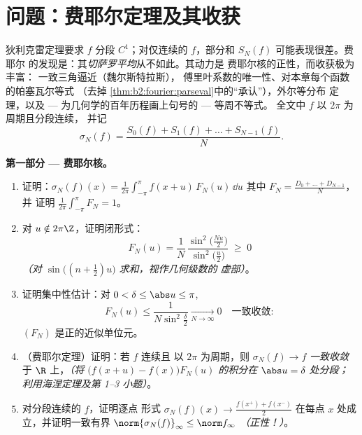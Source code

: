 \section{问题：费耶尔定理及其收获}

\begin{problem}\label{pb:b2:fourier:1}
狄利克雷定理要求 $f$ 分段 $C^1$；对仅连续的
$f$，部分和 $S_N(f)$ 可能表现很差。费耶尔
的发现是：其\emph{切萨罗平均}从不如此。其动力是
费耶尔核的正性，而收获极为丰富：
一致三角逼近（魏尔斯特拉斯），
傅里叶系数的唯一性、对本章每个函数的帕塞瓦尔等式
（去掉
\cref{thm:b2:fourier:parseval}中的“承认”），外尔等分布
定理，以及 --- 为几何学的百年历程画上句号的 ---
等周不等式。
全文中 $f$ 以 $2\pi$ 为周期且分段连续，
并记
\[
\sigma_N(f) = \frac{S_0(f) + S_1(f) + \dots +
S_{N-1}(f)}{N} .
\]

\medskip
\noindent\textbf{第一部分 --- 费耶尔核。}
\begin{enumerate}
  \item 证明：$\sigma_N(f)(x) =
        \frac{1}{2\pi}\int_{-\pi}^{\pi}f(x+u)\,F_N(u)\,\dd u$
        其中 $F_N = \frac{D_0 + \dots + D_{N-1}}{N}$，并
        证明 $\frac{1}{2\pi}\int_{-\pi}^{\pi}F_N = 1$。
  \item 对 $u \notin 2\pi\Z$，证明闭形式：
        \[
        F_N(u) = \frac{1}{N}\,
        \frac{\sin^2\bigl(\frac{Nu}{2}\bigr)}
        {\sin^2\bigl(\frac u2\bigr)} \;\geq\; 0
        \]
        \emph{（对 $\sin\bigl((n+\frac12)u\bigr)$ 求和，视作几何级数的
        虚部）}。
  \item 证明集中性估计：对 $0 < \delta \leq
        \abs u \leq \pi$,
        \[
        F_N(u) \leq \frac{1}{N\sin^2\frac\delta2}
        \xrightarrow[N\to\infty]{} 0
        \quad\text{一致收敛} :
        \]
        $(F_N)$ 是正的近似单位元。
  \item （费耶尔定理）证明：若 $f$ 连续且
        以 $2\pi$ 为周期，则 $\sigma_N(f) \to f$
        \emph{一致收敛}于 $\R$ 上，\emph{（将
        $\bigl(f(x+u) - f(x)\bigr)F_N(u)$ 的积分在 $\abs u =
        \delta$ 处分段；利用海涅定理及第 1--3 小题）}。
  \item 对分段连续的 $f$，证明逐点
        形式 $\sigma_N(f)(x) \to \frac{f(x^+) +
        f(x^-)}{2}$ 在每点 $x$ 处成立，并证明一致有界
        $\norm{\sigma_N(f)}_\infty \leq \norm f_\infty$
        \emph{（正性！）}。
\end{enumerate}


\end{problem}
